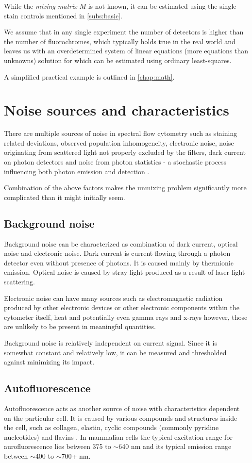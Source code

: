 While the \emph{mixing matrix} $M$ is not known, it can be estimated using the single stain controls mentioned in \cref{subs:basic}. 

We assume that in any single experiment the number of detectors is higher than the number of fluorochromes, which typically holds true in the real world and leaves us with an overdetermined system of linear equations (more equations than unknowns) solution for which can be estimated using ordinary least-squares\cite{anton2005elementary}. 

A simplified practical example is outlined in \cref{chap:math}.

\section{Noise sources and characteristics}
There are multiple sources of noise in spectral flow cytometry such as staining related deviations, observed population inhomogeneity, electronic noise, noise originating from scattered light not properly excluded by the filters, dark current on photon detectors and noise from photon statistics - a stochastic process influencing both photon emission and detection \cite{noise1985}. 

Combination of the above factors makes the unmixing problem significantly more complicated than it might initially seem.

\subsection{Background noise}
Background noise can be characterized as combination of dark current, optical noise and electronic noise. Dark current is current flowing through a photon detector even without presence of photons. It is caused mainly by thermionic emission\cite{FlCytEl04}.
Optical noise is caused by stray light produced as a result of laser light scattering\cite{PosNoiseSteen92}.

Electronic noise can have many sources such as electromagnetic radiation produced by other electronic devices or other electronic components within the cytometer itself, heat and potentially even gamma rays and x-rays however, those are unlikely to be present in meaningful quantities.

Background noise is relatively independent on current signal. Since it is somewhat constant and relatively low, it can be measured and thresholded against minimizing its impact\cite{FlCytEl04}.
\subsection{Autofluorescence}
Autofluorescence acts as another source of noise with characteristics dependent on the particular cell. It is caused by various compounds and structures inside the cell, such as collagen, elastin, cyclic compounds (commonly pyridine nucleotides) and flavins \cite{af1}\cite{af2}. In mammalian cells the typical excitation range for aurofluorescence lies between 375 to $\sim$640 nm and its typical emission range between $\sim$400 to $\sim$700+ nm\cite{af_ranges}. 

